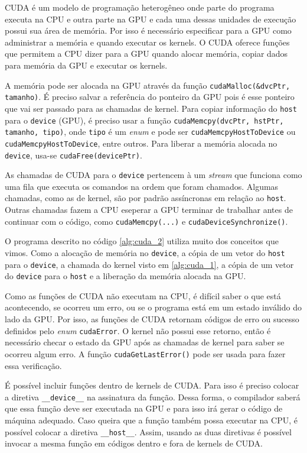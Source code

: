 
CUDA é um modelo de programação heterogêneo onde parte do programa executa na CPU e outra parte na GPU e cada uma dessas unidades de execução possui sua área de memória.
Por isso é necessário especificar para a GPU como administrar a memória e quando executar os kernels. O CUDA oferece funções que permitem a CPU dizer para a GPU quando alocar memória, copiar dados para memória da GPU e executar os kernels.

A memória pode ser alocada na GPU através da função \texttt{cudaMalloc(\&dvcPtr, tamanho)}. É preciso salvar a referência do ponteiro da GPU pois é esse ponteiro que vai ser passado para as chamadas de kernel. Para copiar informação do \texttt{host} para o \texttt{device} (GPU), é preciso usar a função \texttt{cudaMemcpy(dvcPtr, hstPtr, tamanho,  tipo)}, onde \texttt{tipo} é um {\em enum} e pode ser \texttt{cudaMemcpyHostToDevice} ou \texttt{cudaMemcpyHostToDevice}, entre outros. Para liberar a memória alocada no \texttt{device}, usa-se \texttt{cudaFree(devicePtr)}. 

As chamadas de CUDA para o \texttt{device} pertencem à um {\em stream} que funciona como uma fila que executa os comandos na ordem que foram chamados. Algumas chamadas, como as de kernel, são por padrão assíncronas em relação ao \texttt{host}. Outras chamadas fazem a CPU eseperar a GPU terminar de trabalhar antes de continuar com o código, como \texttt{cudaMemcpy(...)} e \texttt{cudaDeviceSynchronize()}.

O programa descrito no código \ref{alg:cuda_2} utiliza muito dos conceitos que vimos. Como a alocação de memória no \texttt{device}, a cópia de um vetor do \texttt{host} para o \texttt{device}, a chamada do kernel visto em \ref{alg:cuda_1}, a cópia de um vetor do \texttt{device} para o \texttt{host} e a liberação da memória alocada na GPU.


Como as funções de CUDA não executam na CPU, é difícil saber o que está acontecendo, se ocorreu um erro, ou se o programa está em um estado inválido do lado da GPU. Por isso, as funções de CUDA retornam códigos de erro ou sucesso definidos pelo {\em enum }\texttt{cudaError}. O kernel não possui esse retorno, então é necessário checar o estado da GPU após as chamadas de kernel para saber se ocorreu algum erro.  A função \texttt{cudaGetLastError()} pode ser usada para fazer essa verificação.

É possível incluir funções dentro de kernels de CUDA. Para isso é preciso colocar a diretiva \texttt{\_\_device\_\_} na assinatura da função. Dessa forma, o compilador saberá que essa função deve ser executada na GPU e para isso irá gerar o código de máquina adequado. Caso queira que a função também possa executar na CPU, é possível colocar a diretiva \texttt{\_\_host\_\_}. Assim, usando as duas diretivas é possível invocar a mesma função em códigos dentro e fora de kernels de CUDA.
